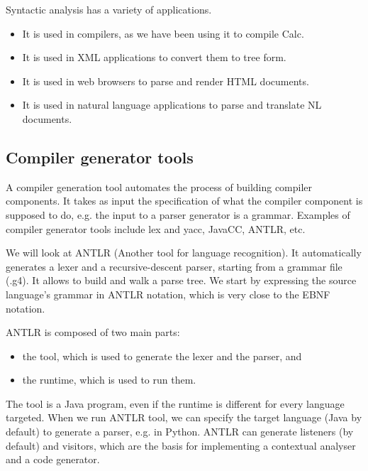 \documentclass[a4paper, openany]{memoir}
\begin{document}
Syntactic analysis has a variety of applications.
\begin{itemize}
    \item It is used in compilers, as we have been using it to compile Calc.
    \item It is used in XML applications to convert them to tree form.
    \item It is used in web browsers to parse and render HTML documents.
    \item It is used in natural language applications to parse and translate NL documents.
\end{itemize}

\subsection{Compiler generator tools}
A compiler generation tool automates the process of building compiler components. It takes as input the specification of what the compiler component is supposed to do, e.g. the input to a parser generator is a grammar. Examples of compiler generator tools include lex and yacc, JavaCC, ANTLR, etc.

We will look at ANTLR (Another tool for language recognition). It automatically generates a lexer and a recursive-descent parser, starting from a grammar file (.g4). It allows to build and walk a parse tree. We start by expressing the source language's grammar in ANTLR notation, which is very close to the EBNF notation.

ANTLR is composed of two main parts:
\begin{itemize}
    \item the tool, which is used to generate the lexer and the parser, and
    \item the runtime, which is used to run them.
\end{itemize}
The tool is a Java program, even if the runtime is different for every language targeted. When we run ANTLR tool, we can specify the target language (Java by default) to generate a parser, e.g. in Python. ANTLR can generate listeners (by default) and visitors, which are the basis for implementing a contextual analyser and a code generator.
\end{document}
